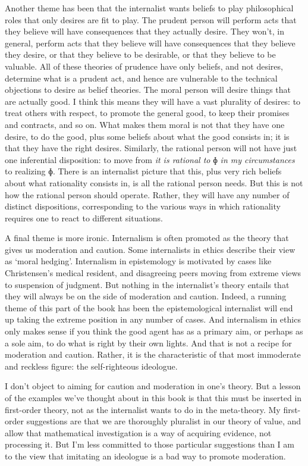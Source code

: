 \documentclass[
  10pt,
  letterpaper,
  twoside]{scrbook}
\begin{document}
Another theme has been that the internalist wants beliefs to play
philosophical roles that only desires are fit to play. The prudent
person will perform acts that they believe will have consequences that
they actually desire. They won't, in general, perform acts that they
believe will have consequences that they believe they desire, or that
they believe to be desirable, or that they believe to be valuable. All
of these theories of prudence have only beliefs, and not desires,
determine what is a prudent act, and hence are vulnerable to the
technical objections to desire as belief theories. The moral person will
desire things that are actually good. I think this means they will have
a vast plurality of desires: to treat others with respect, to promote
the general good, to keep their promises and contracts, and so on. What
makes them moral is not that they have one desire, to do the good, plus
some beliefs about what the good consists in; it is that they have the
right desires. Similarly, the rational person will not have just one
inferential disposition: to move from \emph{it is rational to} ɸ
\emph{in my circumstances} to realizing ɸ. There is an internalist
picture that this, plus very rich beliefs about what rationality
consists in, is all the rational person needs. But this is not how the
rational person should operate. Rather, they will have any number of
distinct dispositions, corresponding to the various ways in which
rationality requires one to react to different situations.

A final theme is more ironic. Internalism is often promoted as the
theory that gives us moderation and caution. Some internalists in ethics
describe their view as `moral hedging'. Internalism in epistemology is
motivated by cases like Christensen's medical resident, and disagreeing
peers moving from extreme views to suspension of judgment. But nothing
in the internalist's theory entails that they will always be on the side
of moderation and caution. Indeed, a running theme of this part of the
book has been the epistemological internalist will end up taking the
extreme position in any number of cases. And internalism in ethics only
makes sense if you think the good agent has as a primary aim, or perhaps
as a sole aim, to do what is right by their own lights. And that is not
a recipe for moderation and caution. Rather, it is the characteristic of
that most immoderate and reckless figure: the self-righteous ideologue.

I don't object to aiming for caution and moderation in one's theory. But
a lesson of the examples we've thought about in this book is that this
must be inserted in first-order theory, not as the internalist wants to
do in the meta-theory. My first-order suggestions are that we are
thoroughly pluralist in our theory of value, and allow that mathematical
investigation is a way of acquiring evidence, not processing it. But I'm
less committed to those particular suggestions than I am to the view
that imitating an ideologue is a bad way to promote moderation.
\end{document}
